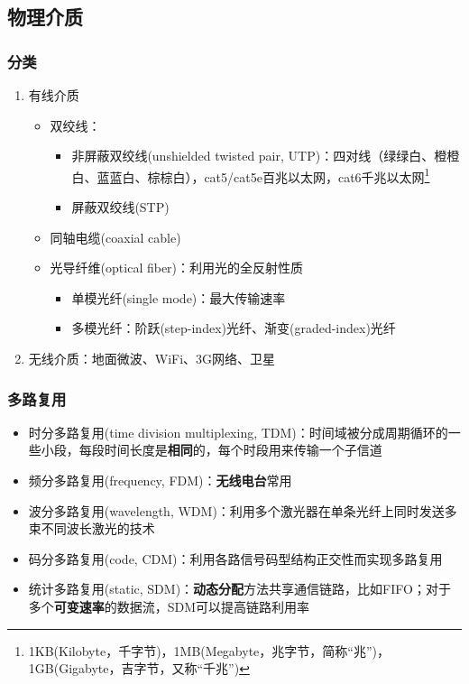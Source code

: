 \subsection{物理介质}
\subsubsection{分类}
\begin{enumerate}
\item 有线介质
\begin{itemize}
	\item 双绞线：
	\begin{itemize}
		\item 非屏蔽双绞线(unshielded twisted pair, UTP)：四对线（绿绿白、橙橙白、蓝蓝白、棕棕白），cat5/cat5e百兆以太网，cat6千兆以太网\footnote{1KB(Kilobyte，千字节)，1MB(Megabyte，兆字节，简称``兆'')，1GB(Gigabyte，吉字节，又称``千兆'')}
		\item 屏蔽双绞线(STP)
	\end{itemize}
	\item 同轴电缆(coaxial cable)
	\item 光导纤维(optical fiber)：利用光的全反射性质
	\begin{itemize}
		\item 单模光纤(single mode)：最大传输速率
		\item 多模光纤：阶跃(step-index)光纤、渐变(graded-index)光纤
	\end{itemize}
\end{itemize}
\item 无线介质：地面微波、WiFi、3G网络、卫星
\end{enumerate}

\subsubsection{多路复用}
\begin{itemize}
	\item 时分多路复用(time division multiplexing, TDM)：时间域被分成周期循环的一些小段，每段时间长度是\textbf{相同}的，每个时段用来传输一个子信道
	\item 频分多路复用(frequency, FDM)：\textbf{无线电台}常用
	\item 波分多路复用(wavelength, WDM)：利用多个激光器在单条光纤上同时发送多束不同波长激光的技术
	\item 码分多路复用(code, CDM)：利用各路信号码型结构正交性而实现多路复用
	\item 统计多路复用(static, SDM)：\textbf{动态分配}方法共享通信链路，比如FIFO；对于多个\textbf{可变速率}的数据流，SDM可以提高链路利用率
\end{itemize}

